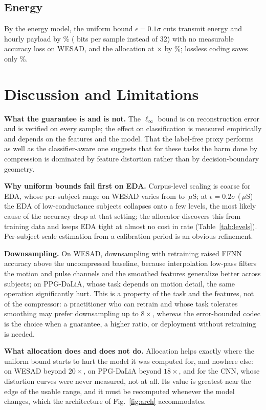 \documentclass[journal,twoside,web]{ieeecolor}
\begin{document}
\subsection{Energy}
By the energy model, the uniform bound $\epsilon=0.1\sigma$ cuts transmit energy and hourly payload by \savingEe\% (\bpsEe{} bits per sample instead of 32) with no measurable accuracy loss on WESAD, and the allocation at \allocClfRatioBA$\times$ by \allocClfSavingBA\%; lossless coding saves only \savingLossless\%.

\section{Discussion and Limitations}
\textbf{What the guarantee is and is not.} The $\ell_\infty$ bound is on reconstruction error and is verified on every sample; the effect on classification is measured empirically and depends on the features and the model. That the label-free proxy performs as well as the classifier-aware one suggests that for these tasks the harm done by compression is dominated by feature distortion rather than by decision-boundary geometry.

\textbf{Why uniform bounds fail first on EDA.} Corpus-level scaling is coarse for EDA, whose per-subject range on WESAD varies from \minEDARange{} to \maxEDARange\,$\mu$S; at $\epsilon=0.2\sigma$ (\epsEDAEf\,$\mu$S) the EDA of low-conductance subjects collapses onto a few levels, the most likely cause of the accuracy drop at that setting; the allocator discovers this from training data and keeps EDA tight at almost no cost in rate (Table~\ref{tab:levels}). Per-subject scale estimation from a calibration period is an obvious refinement.

\textbf{Downsampling.} On WESAD, downsampling with retraining raised FFNN accuracy above the uncompressed baseline, because interpolation low-pass filters the motion and pulse channels and the smoothed features generalize better across subjects; on PPG-DaLiA, whose task depends on motion detail, the same operation significantly hurt. This is a property of the task and the features, not of the compressor: a practitioner who can retrain and whose task tolerates smoothing may prefer downsampling up to $8\times$, whereas the error-bounded codec is the choice when a guarantee, a higher ratio, or deployment without retraining is needed.

\textbf{What allocation does and does not do.} Allocation helps exactly where the uniform bound starts to hurt the model it was computed for, and nowhere else: on WESAD beyond $20\times$, on PPG-DaLiA beyond $18\times$, and for the CNN, whose distortion curves were never measured, not at all. Its value is greatest near the edge of the usable range, and it must be recomputed whenever the model changes, which the architecture of Fig.~\ref{fig:arch} accommodates.
\end{document}
